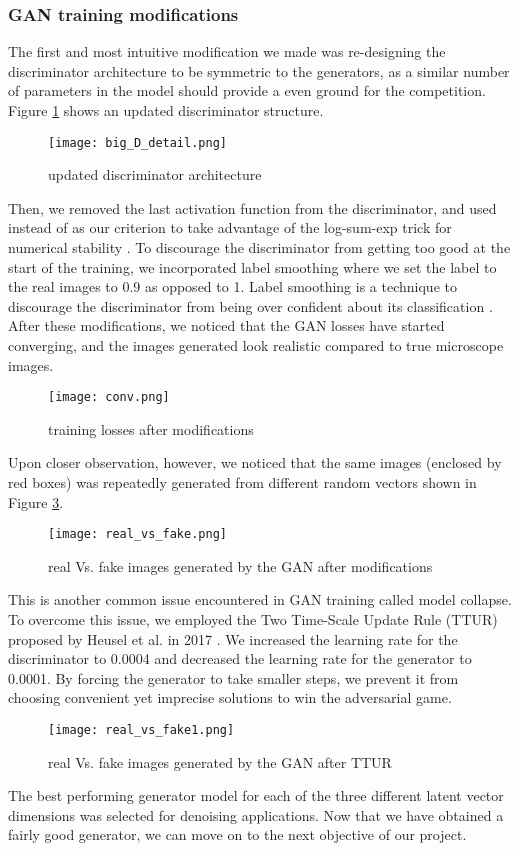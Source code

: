 \documentclass{article}
\newcommand{\code}[1]{{\color{black}{\texttt{#1}}}} %
\begin{document}
\subsubsection{GAN training modifications}
The first and most intuitive modification we made was re-designing the discriminator architecture to be symmetric to the generators, as a similar number of parameters in the model should provide a even ground for the competition. Figure \ref{fig:D} shows an updated discriminator structure.
\begin{figure}[!h]
    \centering
    \texttt{[image: big\_D\_detail.png]}
    \caption{updated discriminator architecture}
    \label{fig:D}
\end{figure}
\FloatBarrier
Then, we removed the last \code{Sigmoid()} activation function from the discriminator, and used \code{BCEWithLogitsLoss()} instead of \code{BCELoss()} as our criterion to take advantage of the log-sum-exp trick for numerical stability \cite{BCE}. To discourage the discriminator from getting too good at the start of the training, we incorporated label smoothing where we set the label to the real images to 0.9 as opposed to 1. Label smoothing is a technique to discourage the discriminator from being over confident about its classification \cite{tips}. After these modifications, we noticed that the GAN losses have started converging, and the images generated look realistic compared to true microscope images. 
\begin{figure}[!h]
    \centering
    \texttt{[image: conv.png]}
    \caption{training losses after modifications}
    \label{fig:mod_loss}
\end{figure}

Upon closer observation, however, we noticed that the same images (enclosed by red boxes) was repeatedly generated from different random vectors shown in Figure \ref{fig:mod_gen}. 
\begin{figure}[!h]
    \centering
    \texttt{[image: real\_vs\_fake.png]}
    \caption{real Vs. fake images generated by the GAN after modifications}
    \label{fig:mod_gen}
\end{figure}
\FloatBarrier
This is another common issue encountered in GAN training called model collapse. To overcome this issue, we employed the Two Time-Scale Update Rule (TTUR) proposed by Heusel et al. in 2017 \cite{TTUR}. We increased the learning rate for the discriminator to 0.0004 and decreased the learning rate for the generator to 0.0001. By forcing the generator to take smaller steps, we prevent it from choosing convenient yet imprecise solutions to win the adversarial game. 
\begin{figure}[!h]
    \centering
    \texttt{[image: real\_vs\_fake1.png]}
    \caption{real Vs. fake images generated by the GAN after TTUR}
    \label{fig:ttur_gen}
\end{figure}
\FloatBarrier
The best performing generator model for each of the three different latent vector dimensions was selected for denoising applications. Now that we have obtained a fairly good generator, we can move on to the next objective of our project.
\end{document}
